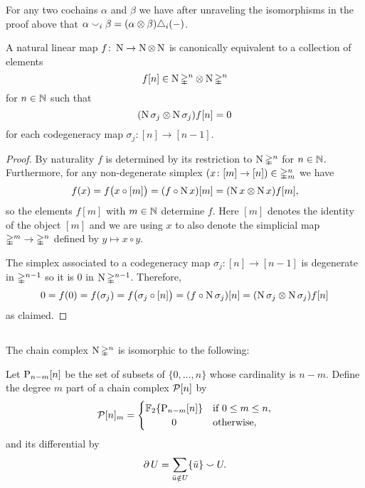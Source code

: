 \begin{remark}
	For any two cochains $\alpha$ and $\beta$ we have after unraveling the isomorphisms in the proof above that $\alpha \cup_i \beta = (\alpha \ot \beta) \triangle_i(-)$.
\end{remark}

\begin{lemma} \label{l:natural linear map}
	A natural linear map $f \colon \chains \to \chains \ot \chains$ is canonically equivalent to a collection of elements
	\[
	f[n] \in \chains \simplex^n \ot \chains \simplex^n
	\]
	for $n \in \N$ such that
	\[
	(\chains \sigma_j \ot \chains \sigma_j) f[n] = 0
	\]
	for each codegeneracy map $\sigma_j \colon [n] \to [n-1]$.
\end{lemma}

\begin{proof}
	By naturality $f$ is determined by its restriction to $\chains \simplex^n$ for $n \in \N$.
	Furthermore, for any non-degenerate simplex $(x \colon [m] \to [n]) \in \simplex^n_m$ we have
	\[
	f(x) = f \big( x \circ [m] \big) =
	(f \circ \chains x) [m] =
	(\chains x \ot \chains x) f [m],
	\]
	so the elements $f[m]$ with $m \in \N$ determine $f$.
	Here $[m]$ denotes the identity of the object $[m]$ and we are using $x$ to also denote the simplicial map $\simplex^m \to \simplex^n$ defined by $y \mapsto x \circ y$.

	The simplex associated to a codegeneracy map $\sigma_j \colon [n] \to [n-1]$ is degenerate in $\simplex^{n-1}$ so it is $0$ in $\chains \simplex^{n-1}$.
	Therefore,
	\[
	0 = f(0) = f(\sigma_j) =
	f \big( \sigma_j \circ [n] \big) =
	(f \circ \chains \sigma_j) [n] =
	(\chains \sigma_j \ot \chains \sigma_j) f [n]
	\]
	as claimed.
\end{proof}

\subsection{}

The chain complex $\chains \simplex^n$ is isomorphic to the following:

\begin{definition}
	Let $\P_{n-m}[n]$ be the set of subsets of $\{0, \dots, n\}$ whose cardinality is $n-m$.
	Define the degree $m$ part of a chain complex $\cP[n]$ by
	\[
	\cP[n]_m = \begin{cases}
	\F\{\P_{n-m}[n]\} & \text{if } 0 \leq m \leq n, \\
	\hfil 0 & \text{otherwise},
	\end{cases}
	\]
	and its differential by
	\[
	\bd U = \sum_{\bar u \notin U} \{\bar u\} \union U.
	\]
\end{definition}

